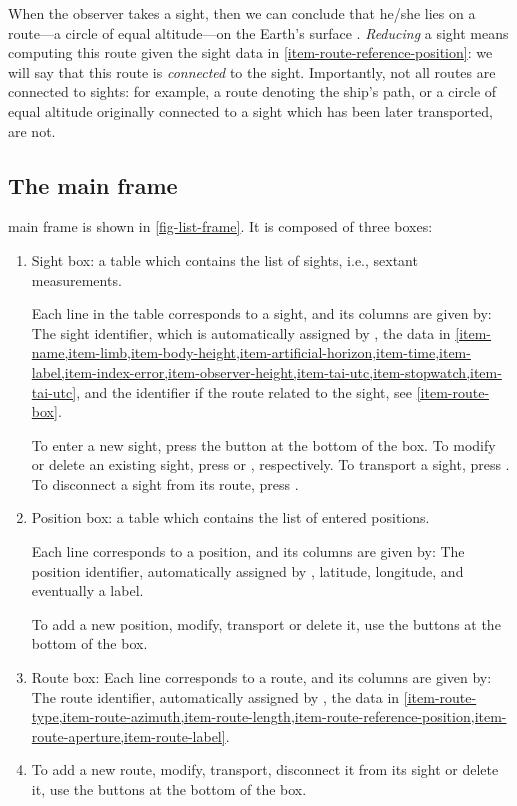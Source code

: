 \documentclass{ol-softwaremanual}
\begin{document}
When the observer takes a sight, then we can conclude that he/she lies on a route---a circle of equal altitude---on the Earth's surface \cite{bowditch2002the}. 
\textit{Reducing} a sight means computing this route given the sight data in \cref{item-route-reference-position}: we will say that this route is \textit{connected} to the sight. Importantly, not all routes are connected to sights: for example, a route denoting the ship's path, or a circle of equal altitude originally connected to a sight which has been later transported, are not. 



\subsection{The main frame}

\thel main frame is shown in \cref{fig-list-frame}. It is composed of three boxes: 
\begin{enumerate}
  \item \label{item-sight-box} Sight box: a table which contains the list of sights, i.e., sextant measurements. 
  
  Each line in the table corresponds to a sight, and its columns are given by: The sight identifier, which is automatically assigned by \thel,  the data in \cref{item-name,item-limb,item-body-height,item-artificial-horizon,item-time,item-label,item-index-error,item-observer-height,item-tai-utc,item-stopwatch,item-tai-utc}, and the identifier if the route related to the sight, see \cref{item-route-box}. 

  To enter a new sight, press the  button at the bottom of the box. To modify or delete an existing sight, press   or  , respectively. To transport a sight, press . 
   To disconnect a sight from its route, press  . 

  \item \label{item-position-box} Position box: a table which contains the list of entered positions. 
  
  Each line corresponds to a position, and its columns are given by: The position identifier, automatically assigned by \thel,  latitude, longitude, and eventually a label. 

To add a new position, modify, transport or delete it, use the buttons at the bottom of the box. 

  \item \label{item-route-box} Route box: Each line corresponds to a route, and its columns are given by: The route identifier, automatically assigned by \thel, the data in \cref{item-route-type,item-route-azimuth,item-route-length,item-route-reference-position,item-route-aperture,item-route-label}. 
  \item 
  To add a new route, modify, transport, disconnect it from its sight or delete it, use the buttons at the bottom of the box. 

\end{enumerate}
\end{document}
